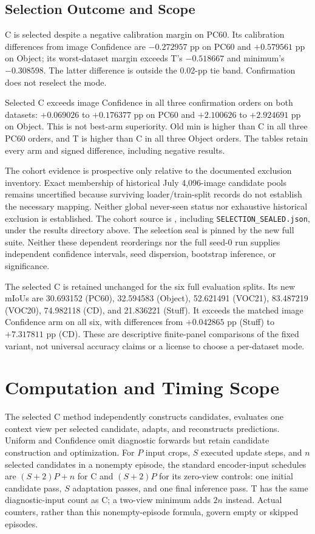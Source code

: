 \subsection{Selection Outcome and Scope}
C is selected despite a negative calibration margin on PC60. Its calibration differences from image Confidence are $-0.272957$ pp on PC60 and $+0.579561$ pp on Object; its worst-dataset margin exceeds T's $-0.518667$ and minimum's $-0.308598$. The latter difference is outside the 0.02-pp tie band. Confirmation does not reselect the mode.



Selected C exceeds image Confidence in all three confirmation orders on both datasets: $+0.069026$ to $+0.176377$ pp on PC60 and $+2.100626$ to $+2.924691$ pp on Object. This is not best-arm superiority. Old min is higher than C in all three PC60 orders, and T is higher than C in all three Object orders. The tables retain every arm and signed difference, including negative results.

The cohort evidence is prospective only relative to the documented exclusion inventory. Exact membership of historical July 4,096-image candidate pools remains uncertified because surviving loader/train-split records do not establish the necessary mapping. Neither global never-seen status nor exhaustive historical exclusion is established. The cohort source is , including \texttt{SELECTION\_SEALED.json}, under the results directory above. The selection seal is pinned by the new full suite. Neither these dependent reorderings nor the full seed-0 run supplies independent confidence intervals, seed dispersion, bootstrap inference, or significance.

The selected C is retained unchanged for the six full evaluation splits. Its new mIoUs are 30.693152 (PC60), 32.594583 (Object), 52.621491 (VOC21), 83.487219 (VOC20), 74.982118 (CD), and 21.836221 (Stuff). It exceeds the matched image Confidence arm on all six, with differences from $+0.042865$ pp (Stuff) to $+7.317811$ pp (CD). These are descriptive finite-panel comparisons of the fixed variant, not universal accuracy claims or a license to choose a per-dataset mode.

\section{Computation and Timing Scope}
\label{app:cost}
The selected C method independently constructs candidates, evaluates one context view per selected candidate, adapts, and reconstructs predictions. Uniform and Confidence omit diagnostic forwards but retain candidate construction and optimization. For $P$ input crops, $S$ executed update steps, and $n$ selected candidates in a nonempty episode, the standard encoder-input schedules are $(S+2)P+n$ for C and $(S+2)P$ for its zero-view controls: one initial candidate pass, $S$ adaptation passes, and one final inference pass. T has the same diagnostic-input count as C; a two-view minimum adds $2n$ instead. Actual counters, rather than this nonempty-episode formula, govern empty or skipped episodes.

